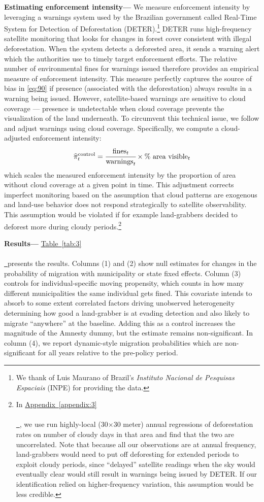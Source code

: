 \documentclass[12pt]{article}
\newcommand*{\tabref}[2][]{%
  \hyperref[{tab:#2}]{%
    Table~\ref*{tab:#2}%
    \ifx\\#1\\%
    \else
      \,#1%
    \fi
  }%
}
\newcommand*{\appendixref}[2][]{%
  \hyperref[{appendix:#2}]{%
    Appendix~\ref*{appendix:#2}%
    \ifx\\#1\\%
    \else
      \,#1%
    \fi
  }%
}
\begin{document}
\quad \textbf{Estimating enforcement intensity---} We measure enforcement intensity by leveraging a warnings system used by the Brazilian government called Real-Time System for Detection of Deforestation (DETER).\footnote{We thank of Luis Maurano of Brazil's \textit{Instituto Nacional de Pesquisas Espaciais} (INPE) for providing the data.} DETER runs high-frequency satellite monitoring that looks for changes in forest cover consistent with illegal deforestation. When the system detects a deforested area, it sends a warning alert which the authorities use to timely target enforcement efforts. The relative number of environmental fines for warnings issued therefore provides an empirical measure of enforcement intensity. This measure perfectly captures the source of bias in \eqref{eq:90} if presence (associated with the deforestation) always results in a warning being issued. However, satellite-based warnings are sensitive to cloud coverage --- presence is undetectable when cloud coverage prevents the visualization of the land underneath. To circumvent this technical issue, we follow \cite{10.1257/app.20200196} and adjust warnings using cloud coverage. Specifically, we compute a cloud-adjusted enforcement intensity: 
 \begin{equation*}
\widehat{\pi}^{\text{control}}_t = \cfrac{\text{fines}_t}{\text{warnings}_t}\times\text{\% area visible}_t
\end{equation*}
which scales the measured enforcement intensity by the proportion of area without cloud coverage at a given point in time. This adjustment corrects imperfect monitoring based on the assumption that cloud patterns are exogenous and land-use behavior does not respond strategically to satellite observability. This assumption would be violated if for example land-grabbers decided to deforest more during cloudy periods.\footnote{In \appendixref{3}, we use run highly-local (30$\times$30 meter) annual regressions of deforestation rates on number of cloudy days in that area and find that the two are uncorrelated. Note that because all our observations are at annual frequency, land-grabbers would need to put off deforesting for extended periods to exploit cloudy periods, since ``delayed'' satellite readings when the sky would eventually clear would still result in warnings being issued by DETER. If our identification relied on higher-frequency variation, this assumption would be less credible.} 
\ 

\quad \textbf{Results---} \tabref{3} presents the results. Columns (1) and (2) show null estimates for changes in the probability of migration with municipality or state fixed effects. Column (3) controls for individual-specific moving propensity, which counts in how many different municipalities the same individual gets fined. This covariate intends to absorb to some extent correlated factors driving unobserved heterogeneity determining how good a land-grabber is at evading detection and also likely to migrate ``anywhere'' at the baseline. Adding this as a control increases the magnitude of the Amnesty dummy, but the estimate remains non-significant. In column (4), we report dynamic-style migration probabilities which are non-significant for all years relative to the pre-policy period. 
\ 
\end{document}
